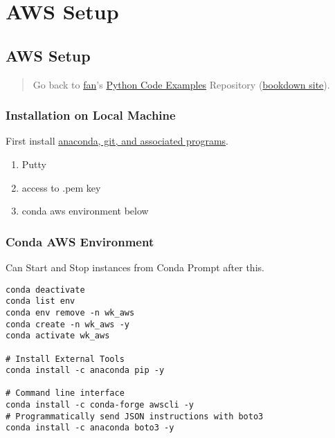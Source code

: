 \documentclass[
]{book}
\providecommand{\tightlist}{%
  \setlength{\itemsep}{0pt}\setlength{\parskip}{0pt}}
\begin{document}
\hypertarget{aws-setup}{%
\section{AWS Setup}\label{aws-setup}}

\hypertarget{aws-setup-1}{%
\subsection{AWS Setup}\label{aws-setup-1}}

\begin{quote}
Go back to \href{http://fanwangecon.github.io/}{fan}'s \href{https://fanwangecon.github.io/pyfan/}{Python Code Examples} Repository (\href{https://fanwangecon.github.io/pyfan/bookdown}{bookdown site}).
\end{quote}

\hypertarget{installation-on-local-machine}{%
\subsubsection{Installation on Local Machine}\label{installation-on-local-machine}}

First install \href{https://fanwangecon.github.io/Tex4Econ/nontex/install/windows/fn_installations.html}{anaconda, git, and associated programs}.

\begin{enumerate}
\def\labelenumi{\arabic{enumi}.}
\tightlist
\item
  Putty
\item
  access to .pem key
\item
  conda aws environment below
\end{enumerate}

\hypertarget{conda-aws-environment}{%
\subsubsection{Conda AWS Environment}\label{conda-aws-environment}}

Can Start and Stop instances from Conda Prompt after this.

\begin{verbatim}
conda deactivate
conda list env
conda env remove -n wk_aws
conda create -n wk_aws -y
conda activate wk_aws

# Install External Tools
conda install -c anaconda pip -y

# Command line interface
conda install -c conda-forge awscli -y
# Programmatically send JSON instructions with boto3
conda install -c anaconda boto3 -y
\end{verbatim}
\end{document}
